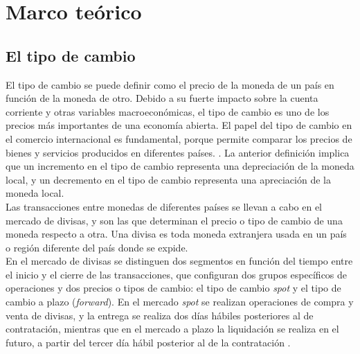 	\section{Marco teórico}
	
	
	\subsection{El tipo de cambio} 
	El tipo de cambio se puede definir como el precio de la moneda de un país en función de la moneda de otro. Debido a su fuerte impacto sobre la cuenta corriente y otras variables macroeconómicas, el tipo de cambio es uno de los precios más importantes de una economía abierta. El papel del tipo de cambio en el comercio internacional es fundamental, porque permite comparar los precios de bienes y servicios producidos en diferentes países. \parencite{intecon}. La anterior definición implica que un incremento en el tipo de cambio representa una depreciación de la moneda local, y un decremento en el tipo de cambio representa una apreciación de la moneda local. \parencite{exchecon}\\
	
	
	Las transacciones entre monedas de diferentes países se llevan a cabo en el mercado de divisas, y son las que determinan el precio o tipo de cambio de una moneda respecto a otra. Una divisa es toda moneda extranjera usada en un país o región diferente del país donde se expide. \parencite{mochon}\\
	
	En el mercado de divisas se distinguen dos segmentos en función del tiempo entre el inicio y el cierre de las transacciones, que configuran dos grupos específicos de operaciones y dos precios o tipos de cambio: el tipo de cambio \textit{spot} y el tipo de cambio a plazo (\textit{forward}). En el mercado \textit{spot} se realizan operaciones de compra y venta de divisas, y la entrega se realiza dos días hábiles posteriores al de contratación, mientras que en el mercado a plazo la liquidación se realiza en el futuro, a partir del tercer día hábil posterior al de la contratación \parencite{mochon}.\\
	
